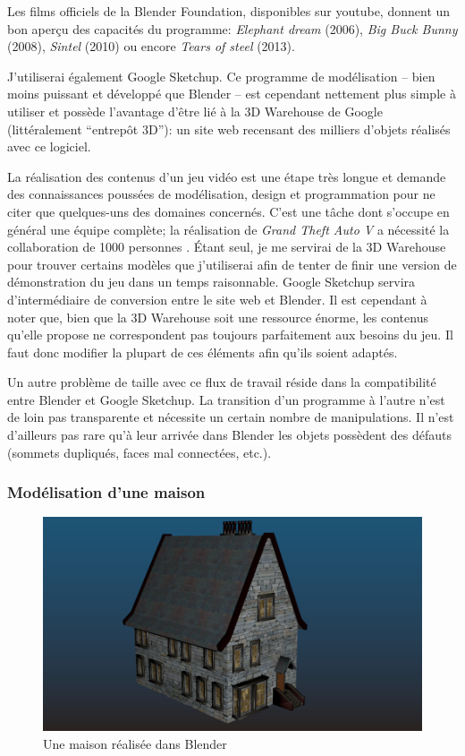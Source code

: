 Les films officiels de la Blender Foundation, disponibles sur youtube, donnent un bon aperçu des capacités du programme: \textit{Elephant dream} (2006), \textit{Big Buck Bunny} (2008), \textit{Sintel} (2010) ou encore \textit{Tears of steel} (2013).

J'utiliserai également Google Sketchup. Ce programme de modélisation -- bien moins puissant et développé que Blender -- est cependant nettement plus simple à utiliser et possède l'avantage d'être lié à la 3D Warehouse de Google (littéralement \enquote{entrepôt 3D}): un site web recensant des milliers d'objets réalisés avec ce logiciel.

La réalisation des contenus d'un jeu vidéo est une étape très longue et demande des connaissances poussées de modélisation, design et programmation pour ne citer que quelques-uns des domaines concernés. C'est une tâche dont s'occupe en général une équipe complète; la réalisation de \textit{Grand Theft Auto V} a nécessité la collaboration de 1000 personnes \cite{RockstarMorethan1000peoplemadeGTAV_}. Étant seul, je me servirai de la 3D Warehouse pour trouver certains modèles que j'utiliserai afin de tenter de finir une version de démonstration du jeu dans un temps raisonnable. Google Sketchup servira d'intermédiaire de conversion entre le site web et Blender. Il est cependant à noter que, bien que la 3D Warehouse soit une ressource énorme, les contenus qu'elle propose ne correspondent pas toujours parfaitement aux besoins du jeu. Il faut donc modifier la plupart de ces éléments afin qu'ils soient adaptés.

Un autre problème de taille avec ce flux de travail réside dans la compatibilité entre Blender et Google Sketchup. La transition d'un programme à l'autre n'est de loin pas transparente et nécessite un certain nombre de manipulations. Il n'est d'ailleurs pas rare qu'à leur arrivée dans Blender les objets possèdent des défauts (sommets dupliqués, faces mal connectées, etc.).



\subsubsection{Modélisation d'une maison}

\begin{figure}[ht!]
	\center
	\includegraphics[width=\textwidth]{images/Technique/modelisationMaison.png}
	\caption{\label{fig:modelisationMaison}Une maison réalisée dans Blender}
\end{figure}

